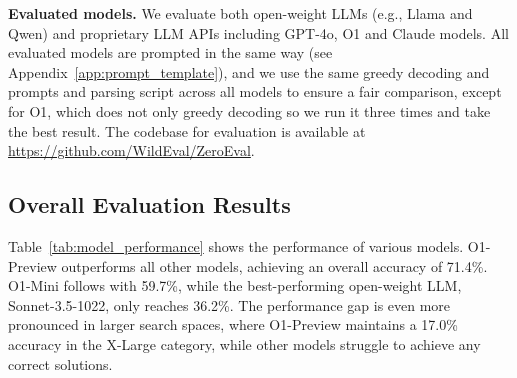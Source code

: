 


\textbf{Evaluated models.} We evaluate both open-weight LLMs (e.g., Llama and Qwen) and proprietary LLM APIs including GPT-4o, O1 and Claude models. 
All evaluated models are prompted in the same way (see Appendix~\ref{app:prompt_template}), and we use the same greedy decoding and prompts and parsing script across all models to ensure a fair comparison, except for O1, which does not only greedy decoding so we run it three times and take the best result. 
The codebase for evaluation is available at \url{https://github.com/WildEval/ZeroEval}.

\subsection{Overall Evaluation Results}

Table~\ref{tab:model_performance} shows the performance of various models. O1-Preview outperforms all other models, achieving an overall accuracy of 71.4\%. O1-Mini follows with 59.7\%, while the best-performing open-weight LLM, Sonnet-3.5-1022, only reaches 36.2\%. The performance gap is even more pronounced in larger search spaces, where O1-Preview maintains a 17.0\% accuracy in the X-Large category, while other models struggle to achieve any correct solutions.


